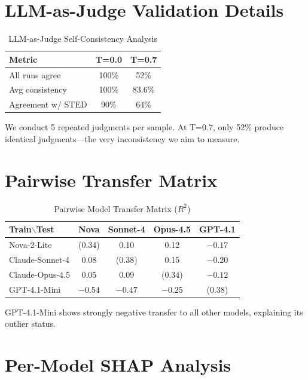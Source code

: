 \documentclass[sigconf,anonymous,review]{acmart}
\begin{document}
\section{LLM-as-Judge Validation Details}
\label{app:llm_judge}

\begin{table}[h]
\centering
\caption{LLM-as-Judge Self-Consistency Analysis}
\small
\begin{tabular}{@{}lcc@{}}
\toprule
\textbf{Metric} & \textbf{T=0.0} & \textbf{T=0.7} \\
\midrule
All runs agree & 100\% & 52\% \\
Avg consistency & 100\% & 83.6\% \\
Agreement w/ STED & 90\% & 64\% \\
\bottomrule
\end{tabular}
\end{table}

We conduct 5 repeated judgments per sample. At T=0.7, only 52\% produce identical judgments---the very inconsistency we aim to measure.

\section{Pairwise Transfer Matrix}
\label{app:transfer}

\begin{table}[h]
\centering
\caption{Pairwise Model Transfer Matrix ($R^2$)}
\small
\begin{tabular}{@{}lcccc@{}}
\toprule
\textbf{Train$\backslash$Test} & \textbf{Nova} & \textbf{Sonnet-4} & \textbf{Opus-4.5} & \textbf{GPT-4.1} \\
\midrule
Nova-2-Lite & (0.34) & 0.10 & 0.12 & $-0.17$ \\
Claude-Sonnet-4 & 0.08 & (0.38) & 0.15 & $-0.20$ \\
Claude-Opus-4.5 & 0.05 & 0.09 & (0.34) & $-0.12$ \\
GPT-4.1-Mini & $-0.54$ & $-0.47$ & $-0.25$ & (0.38) \\
\bottomrule
\end{tabular}
\end{table}

GPT-4.1-Mini shows strongly negative transfer to all other models, explaining its outlier status.

\section{Per-Model SHAP Analysis}
\label{app:permodel_shap}
\end{document}
